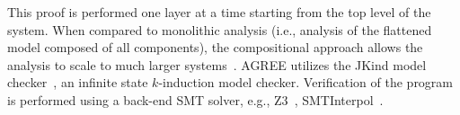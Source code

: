 This proof is performed one layer at a time starting from the top level of the system. When compared to monolithic analysis (i.e., analysis of the flattened model composed of all components), the compositional approach allows the analysis to scale to much larger systems~\cite{NFM2012:CoGaMiWhLaLu}. AGREE utilizes the JKind model checker~\cite{2017arXiv171201222G}, an infinite state $k$-induction model checker. Verification of the program is performed using a back-end SMT solver, e.g., Z3~\cite{z3}, SMTInterpol~\cite{smtInterpol}. 